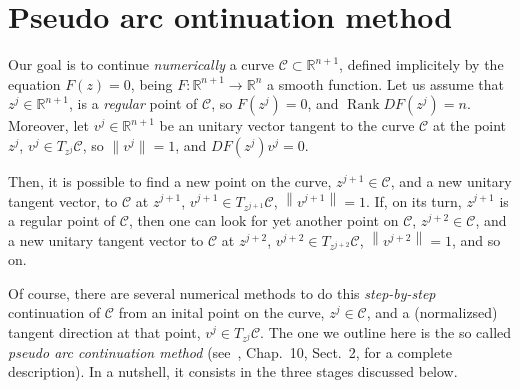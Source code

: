 \documentclass[11pt,reqno,twoside]{article}
\newcommand{\R}{\ensuremath{\mathbb{R}}}
\newcommand{\rank}{\mathop{\mathrm{Rank}}}
\theoremstyle{remark}
\begin{document}
\title{}
\author{}
\date{}

\section*{Pseudo arc ontinuation method}\label{sec:pseudoArc} Our goal is to continue
\emph{numerically} a curve $\mathcal{C}\subset\R^{n+1}$, defined
implicitely by the equation
       $F(z) = 0$,
being $F:\R^{n+1}\longrightarrow \R^{n}$ a smooth function. Let us assume
that $z^{j}\in\R^{n+1}$, is a \emph{regular} point of $\mathcal{C}$, so
$F\left(z^{j}\right) = 0$, and
$\rank DF\left(z^{j}\right) = n$.
Moreover, let $v^{j}\in\R^{n+1}$ be an unitary vector tangent to the curve
$\mathcal{C}$ at the point $z^{j}$, $v^{j}\in T_{z^{j}}\mathcal{C}$, so
  $\| v^{j}\| = 1$, and
  $DF\left(z^{j}\right) v^{j} = 0$.

Then, it is possible to find a new point on the curve,
$z^{j+1}\in\mathcal{C}$, and a new unitary tangent vector, to
$\mathcal{C}$ at $z^{j+1}$, $v^{j+1}\in T_{z^{j+1}}\mathcal{C}$,
$\left\|v^{j+1}\right\| = 1$. If, on its turn, $z^{j+1}$ is a regular point
of $\mathcal{C}$, then  one can look for yet another point on
$\mathcal{C}$, $z^{j+2}\in\mathcal{C}$, and a new unitary tangent vector to
$\mathcal{C}$ at $z^{j+2}$, $v^{j+2}\in T_{z^{j+2}}\mathcal{C}$,
$\left\|v^{j+2}\right\| = 1$, and so on.

Of course, there are several numerical methods to do this
\emph{step-by-step} continuation of $\mathcal{C}$ from an inital point on
the curve, $z^{j}\in\mathcal{C}$, and a (normalizsed) tangent direction at
that point, $v^{j}\in T_{z^{j}}\mathcal{C}$. The one we outline here is the so
called \emph{pseudo arc continuation method} (see~\cite{Kuznetsov2004},
Chap.~10, Sect.~2, for a complete description). In a nutshell, it consists
in the three stages discussed below.
\end{document}
